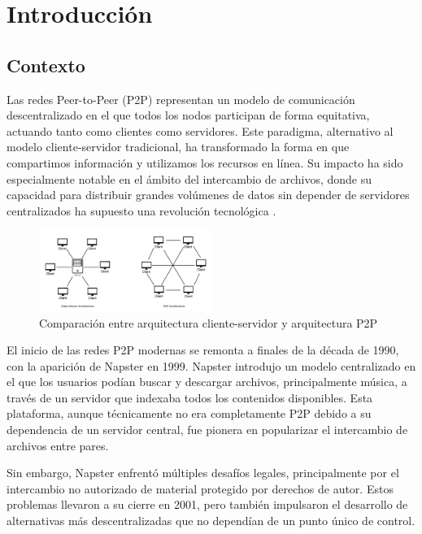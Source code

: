 \setlength{\parskip}{\baselineskip}


\chapter{Introducción}
\label{cap:introduccion}


\section{Contexto}

Las redes Peer-to-Peer (P2P) representan un modelo de comunicación descentralizado en el que todos los nodos participan de forma equitativa, actuando tanto como clientes como servidores. Este paradigma, alternativo al modelo cliente-servidor tradicional, ha transformado la forma en que compartimos información y utilizamos los recursos en línea. Su impacto ha sido especialmente notable en el ámbito del intercambio de archivos, donde su capacidad para distribuir grandes volúmenes de datos sin depender de servidores centralizados ha supuesto una revolución tecnológica \cite{schollmeier2001}.


\begin{figure}[h]
    \centering
    \includegraphics[width = 0.5\textwidth]{Imagenes/Vectorial/client-server-vs-p2p}
    \caption{Comparaci\'on entre arquitectura cliente-servidor y arquitectura P2P}
    \label{fig:clientVsp2p}
\end{figure}


El inicio de las redes P2P modernas se remonta a finales de la década de 1990, con la aparición de Napster en 1999. Napster introdujo un modelo centralizado en el que los usuarios podían buscar y descargar archivos, principalmente música, a través de un servidor que indexaba todos los contenidos disponibles. Esta plataforma, aunque técnicamente no era completamente P2P debido a su dependencia de un servidor central, fue pionera en popularizar el intercambio de archivos entre pares.


Sin embargo, Napster enfrentó múltiples desafíos legales, principalmente por el intercambio no autorizado de material protegido por derechos de autor. Estos problemas llevaron a su cierre en 2001, pero también impulsaron el desarrollo de alternativas más descentralizadas que no dependían de un punto único de control.


